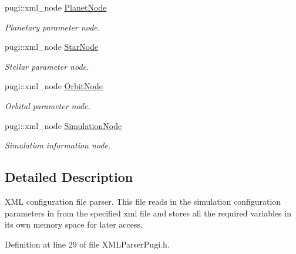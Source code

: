\begin{DoxyCompactItemize}
pugi::xml\_\-node \hyperlink{classConfig_1_1Config_a86646003839a5b91e5c9281bb0c65e4a}{PlanetNode}
\begin{DoxyCompactList}\small\item\em Planetary parameter node. \item\end{DoxyCompactList}\item 
pugi::xml\_\-node \hyperlink{classConfig_1_1Config_ae031c18b0ec9ff285a88341b2a9da6d3}{StarNode}
\begin{DoxyCompactList}\small\item\em Stellar parameter node. \item\end{DoxyCompactList}\item 
pugi::xml\_\-node \hyperlink{classConfig_1_1Config_a5b48e9e8de00ec0f85d7ac2bae12212d}{OrbitNode}
\begin{DoxyCompactList}\small\item\em Orbital parameter node. \item\end{DoxyCompactList}\item 
pugi::xml\_\-node \hyperlink{classConfig_1_1Config_a116dd11fe52f850709971ba73b8f7560}{SimulationNode}
\begin{DoxyCompactList}\small\item\em Simulation information node. \item\end{DoxyCompactList}\end{DoxyCompactItemize}


\subsection{Detailed Description}
XML configuration file parser. This file reads in the simulation configuration parameters in from the specified xml file and stores all the required variables in its own memory space for later access. 

Definition at line 29 of file XMLParserPugi.h.



